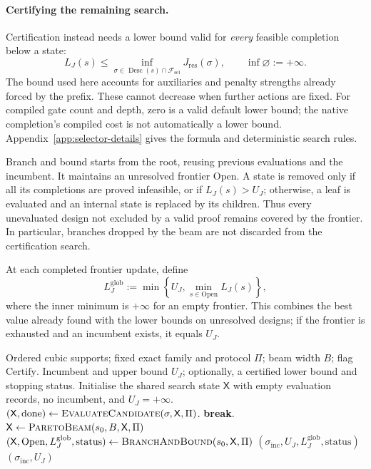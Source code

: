 \documentclass[a4paper,onecolumn,11pt,unpublished]{quantumarticle}
\theoremstyle{remark}
\begin{document}
\paragraph{Certifying the remaining search.}
Certification instead needs a lower bound valid for \emph{every} feasible
completion below a state:
\begin{equation}
L_J(s)\leq
\inf_{\sigma\in\operatorname{Desc}(s)\cap\mathcal F_{\mathrm{sel}}}
J_{\mathrm{res}}(\sigma),
\qquad \inf\varnothing:=+\infty.
\label{eq:admissible-bound}
\end{equation}
The bound used here accounts for auxiliaries and penalty strengths already
forced by the prefix.  These cannot decrease when further actions are fixed.
For compiled gate count and depth, zero is a valid default lower bound;
the native completion's compiled cost is not automatically a lower bound.
Appendix~\ref{app:selector-details} gives the formula and deterministic
search rules.

Branch and bound starts from the root, reusing previous evaluations and the
incumbent.  It maintains an unresolved frontier \(\mathrm{Open}\).  A state
is removed only if all its completions are proved infeasible, or if
\(L_J(s)>U_J\); otherwise, a leaf is evaluated and an internal state is
replaced by its children.  Thus every unevaluated design not excluded by a
valid proof remains covered by the frontier.  In particular, branches dropped
by the beam are not discarded from the certification search.

At each completed frontier update, define
\begin{equation}
L_J^{\mathrm{glob}}:=
\min\left\{U_J,\min_{s\in\mathrm{Open}}L_J(s)\right\},
\label{eq:global-lower-bound}
\end{equation}
where the inner minimum is \(+\infty\) for an empty frontier.  This combines
the best value already found with the lower bounds on unresolved designs;
if the frontier is exhausted and an incumbent exists, it equals \(U_J\).


\begin{algorithm}[H]
\caption{Compiler-aware representation selector}
\label{alg:selector}
\begin{algorithmic}[1]
\Require Ordered cubic supports; fixed exact family and protocol $\Pi$;
beam width $B$; flag $\mathrm{Certify}$.
\Ensure Incumbent and upper bound $U_J$; optionally, a certified lower bound
and stopping status.
\State Initialise the shared search state $\mathsf X$ with empty evaluation
records, no incumbent, and $U_J=+\infty$.
    \State $(\mathsf X,\mathrm{done})\gets\Call{EvaluateCandidate}{\sigma,\mathsf X,\Pi}$.
     \State \textbf{break}. \EndIf
\EndFor
\State $\mathsf X\gets\Call{ParetoBeam}{s_0,B,\mathsf X,\Pi}$
    \State $(\mathsf X,\mathrm{Open},L_J^{\mathrm{glob}},\mathrm{status})
    \gets\Call{BranchAndBound}{s_0,\mathsf X,\Pi}$
    \State \Return $(\sigma_{\mathrm{inc}},U_J,L_J^{\mathrm{glob}},\mathrm{status})$
\Else
    \State \Return $(\sigma_{\mathrm{inc}},U_J)$
\EndIf
\end{algorithmic}
\end{algorithm}
\end{document}

